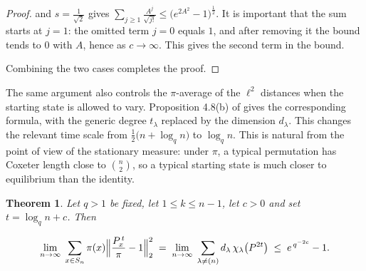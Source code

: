 \documentclass[11pt]{article}
\theoremstyle{plain}  %
\newtheorem{theorem}{Theorem}[section]
\begin{document}
\begin{proof}
and $s=\frac{1}{\sqrt2}$ gives
$\sum_{j\ge1}\frac{A^{j}}{\sqrt{j!}} \le \bigl(e^{2A^{2}}-1\bigr)^{\frac{1}{2}}$. It is
important that the sum starts at $j=1$: the omitted term $j=0$ equals $1$, and
after removing it the bound tends to $0$ with $A$, hence as $c\to\infty$.
This gives the second term in the bound.

Combining the two cases completes the proof.
\end{proof}

The same argument also controls the $\pi$-average of the $\ell^2$ distances when the
starting state is allowed to vary. Proposition 4.8(b) of \cite{DiaconisRam2000} gives
the corresponding formula, with the generic degree $t_\lambda$ replaced by the
dimension $d_\lambda$. This changes the relevant time scale from
$\frac12\bigl(n+\log_q n\bigr)$ to $\log_q n$. This is natural from the point of
view of the stationary measure: under $\pi$, a typical permutation has Coxeter length
close to $\binom{n}{2}$, so a typical starting state is much closer to equilibrium than
the identity.

\begin{theorem}\label{thm:upperavg}
Let $q>1$ be fixed, let $1 \le k \le n-1$, let $c>0$ and set
$t = \log_q n + c$. Then

$$
  \lim_{n\to\infty}\;
  \sum_{x \in S_n}\pi(x)\Bigl\|\frac{P^{\,t}_{x}}{\pi}-1\Bigr\|_2^{2}
  \;=\;
  \lim_{n\to\infty}\;
  \sum_{\lambda \ne (n)} d_\lambda\,\chi_\lambda\bigl(P^{2t}\bigr)
  \;\le\; e^{\,q^{-2c}}-1 .
$$

\end{theorem}
\end{document}
